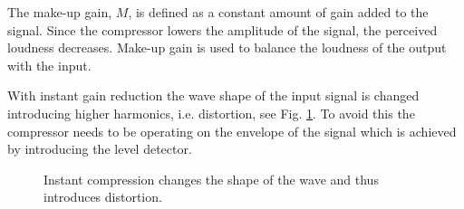 \documentclass[../main2.tex]{subfiles}
\providecommand{\rootdir}{..}
\begin{document}
The make-up gain, $M$, is defined as a constant amount of gain added to the signal. Since the compressor lowers the amplitude of the signal, the perceived loudness decreases. Make-up gain is used to balance the loudness of the output with the input.

With instant gain reduction the wave shape of the input signal is changed introducing higher harmonics, i.e. distortion, see Fig. \ref{fig:instant_comp}. To avoid this the compressor needs to be operating on the envelope of the signal which is achieved by introducing the level detector.
\begin{figure}[ht]
\centering

\caption{Instant compression changes the shape of the wave and thus introduces distortion.} 
\label{fig:instant_comp}
\end{figure}
\end{document}
